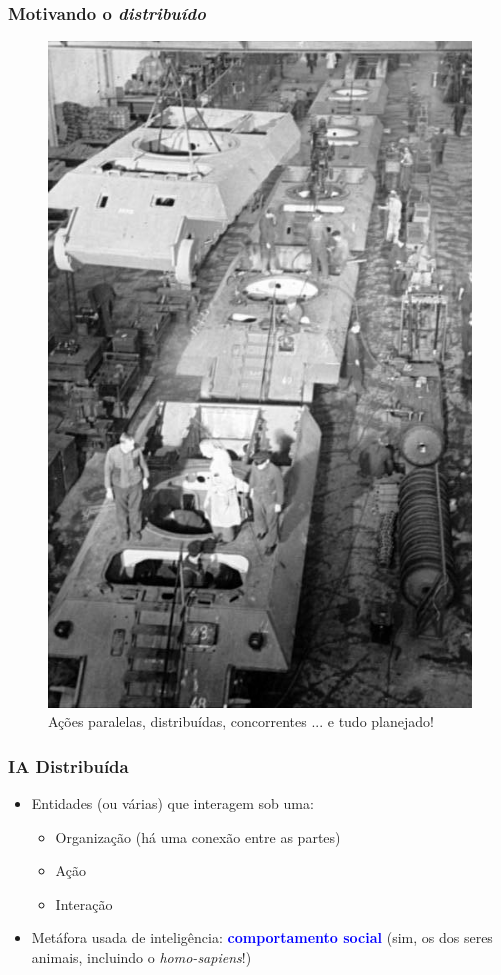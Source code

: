 \begin{frame}

  \frametitle{Motivando o  \textit{distribuído}}
        
\begin{figure}[!ht]
\centering
\includegraphics[height =.6\textheight,width=.4\textwidth]{figuras/fabrica_tanques.jpg}
\caption{Ações paralelas, distribuídas, concorrentes ... e tudo planejado!}
\end{figure}
    
   
\end{frame}







\begin{frame} %


\frametitle{IA Distribuída}

\begin{itemize}
  \item Entidades (ou várias) que interagem sob uma:
  \begin{itemize}
    \item Organização (há uma conexão entre as partes)
     \item Ação 
     \item Interação
  \end{itemize}

     \item Metáfora usada de inteligência: \textcolor{blue}{\textbf{comportamento  social}} (sim, os dos seres animais, incluindo o \textit{homo-sapiens}!)
\end{itemize}


\end{frame}

